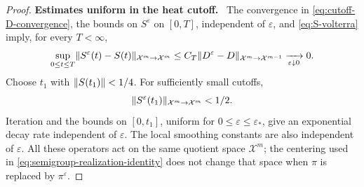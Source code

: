 \documentclass[11pt,reqno]{amsart}
\numberwithin{equation}{section}
\theoremstyle{plain}
\theoremstyle{remark}
\DeclarePairedDelimiter{\norm}{\lVert}{\rVert}
\newcommand{\parheading}[1]{\par\medskip\noindent\textbf{#1}\ }
\newcommand{\Xspace}{\mathcal X}
\begin{document}
\begin{proof}
\parheading{Estimates uniform in the heat cutoff.}
The convergence in \eqref{eq:cutoff-D-convergence}, the bounds on $S^\varepsilon$ on $[0,T]$, independent of $\varepsilon$, and \eqref{eq:S-volterra} imply, for every $T<\infty$,
\begin{equation}\label{eq:cutoff-semigroup-convergence}
 \sup_{0\le t\le T}\norm{S^\varepsilon(t)-S(t)}_{\Xspace^m\to\Xspace^m}
 \le C_T\norm{D^\varepsilon-D}_{\Xspace^m\to\Xspace^{m-1}}
 \xrightarrow[\varepsilon\downarrow0]{}0.
\end{equation}
Choose $t_1$ with $\norm{S(t_1)}<1/4$. For sufficiently small cutoffs,
\begin{equation}\label{eq:cutoff-common-contraction}
 \norm{S^\varepsilon(t_1)}_{\Xspace^m\to\Xspace^m}<1/2.
\end{equation}
Iteration and the bounds on $[0,t_1]$, uniform for $0\le\varepsilon\le\varepsilon_*$, give an exponential decay rate independent of $\varepsilon$. The local smoothing constants are also independent of $\varepsilon$. All these operators act on the same quotient space $\Xspace^m$; the centering used in \eqref{eq:semigroup-realization-identity} does not change that space when $\pi$ is replaced by $\pi^\varepsilon$.
\end{proof}
\end{document}
